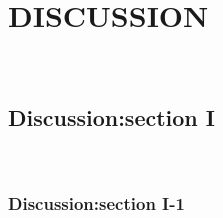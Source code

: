 \chapter{DISCUSSION}
\lipsum[1-4]~\cite{anderson1964hard}

\section{Discussion:section I}
\lipsum[1-4]~\cite{anderson1964hard}

\subsection{Discussion:section I-1}
\lipsum[1-4]~\cite{anderson1964hard}
